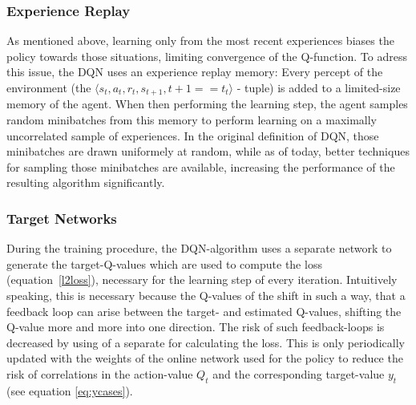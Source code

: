 \subsubsection*{Experience Replay}
As mentioned above, learning only from the most recent experiences biases the policy towards those situations, limiting convergence of the Q-function. To adress this issue, the DQN uses an experience replay memory: Every percept of the environment (the $\langle s_t, a_t, r_t, s_{t+1}, t+1==t_t \rangle$ - tuple) is added to a limited-size memory of the agent. When then performing the learning step, the agent samples random minibatches from this memory to perform learning on a maximally uncorrelated sample of experiences. In the original definition of DQN, those minibatches are drawn uniformely at random, while as of today, better techniques for sampling those minibatches are available\cite{schaul_prioritized_2015}, increasing the performance of the resulting algorithm significantly. %

\subsubsection*{Target Networks}
During the training procedure, the DQN-algorithm uses a separate network to generate the target-Q-values which are used to compute the loss (equation~\ref{l2loss}), necessary for the learning step of every iteration. Intuitively speaking, this is necessary because the Q-values of the  shift in such a way, that a feedback loop can arise between the target- and estimated Q-values, shifting the Q-value more and more into one direction. %
The risk of such feedback-loops is decreased by using of a separate  for calculating the loss. This is only periodically updated with the weights of the online network used for the policy to reduce the risk of correlations in the action-value $Q_t$ and the corresponding target-value $y_t$ (see equation \ref{eq:ycases}).\\

